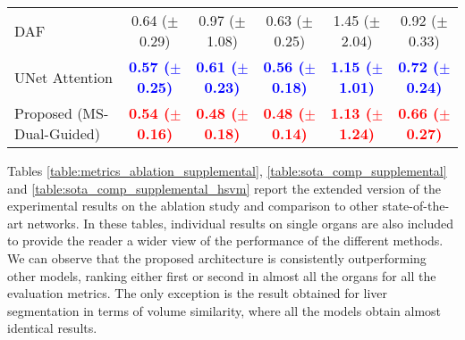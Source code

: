 \documentclass[journal]{IEEEtran}
\begin{document}
\begin{table*}[t!]
\begin{tabular}{lcccc|c}
DAF \cite{wang18d}  & 0.64 ($\pm$0.29) & 0.97 ($\pm$1.08) & 0.63 ($\pm$0.25)& 1.45 ($\pm$2.04)&  0.92 ($\pm$0.33)  \\
UNet Attention \cite{schlemper2019attention}  &   \textcolor{blue}{\textbf{0.57 ($\pm$0.25)}} & \textcolor{blue}{\textbf{0.61 ($\pm$0.23)}}&  \textcolor{blue}{\textbf{0.56 ($\pm$0.18)}} & \textcolor{blue}{\textbf{1.15 ($\pm$1.01)}}&  \textcolor{blue}{\textbf{0.72 ($\pm$0.24)}}   \\
Proposed (MS-Dual-Guided)  & \textcolor{red}{\textbf{0.54 ($\pm$0.16)}}  & \textcolor{red}{\textbf{0.48 ($\pm$0.18)}}&  \textcolor{red}{\textbf{0.48 ($\pm$0.14)}} & \textcolor{red}{\textbf{1.13 ($\pm$1.24)}} &  \textcolor{red}{\textbf{0.66 ($\pm$0.27)}} \\
\midrule
\midrule
\end{tabular}

\caption{Comparison of the proposed network to other state-of-the-art architectures on the CHAOS dataset (multi-organ segmentation on MRI task). The values show the average result of the experiments averaged over the 3 folds. Best results are represented in red bold, while blue is used to highlight the second best performance.}
\label{table:sota_comp_supplemental}
\end{table*}

Tables \ref{table:metrics_ablation_supplemental}, \ref{table:sota_comp_supplemental} and \ref{table:sota_comp_supplemental_hsvm} report the extended version of the experimental results on the ablation study and comparison to other state-of-the-art networks. In these tables, individual results on single organs are also included to provide the reader a wider view of the performance of the different methods. We can observe that the proposed architecture is consistently outperforming other models, ranking either first or second in almost all the organs for all the evaluation metrics. The only exception is the result obtained for liver segmentation in terms of volume similarity, where all the models obtain almost identical results.


\end{document}
